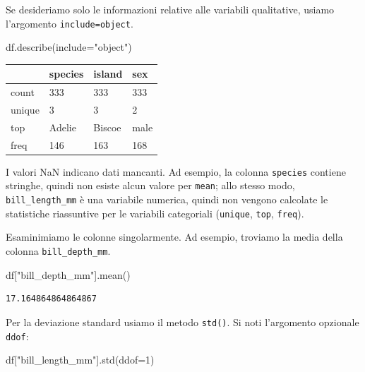 \documentclass[
  letterpaper,
  krantz2]{{[}./krantz{]}}
\newenvironment{Shaded}{\begin{snugshade}}{\end{snugshade}}
\newcommand{\DecValTok}[1]{\textcolor[rgb]{0.68,0.00,0.00}{#1}}
\newcommand{\NormalTok}[1]{\textcolor[rgb]{0.00,0.23,0.31}{#1}}
\newcommand{\OperatorTok}[1]{\textcolor[rgb]{0.37,0.37,0.37}{#1}}
\newcommand{\StringTok}[1]{\textcolor[rgb]{0.13,0.47,0.30}{#1}}
\begin{document}
Se desideriamo solo le informazioni relative alle variabili qualitative,
usiamo l'argomento
\texttt{include=\textquotesingle{}object\textquotesingle{}}.

\begin{Shaded}
\begin{Highlighting}[]
\NormalTok{df.describe(include}\OperatorTok{=}\StringTok{"object"}\NormalTok{)}
\end{Highlighting}
\end{Shaded}

\begin{longtable}[]{@{}llll@{}}
\toprule\noalign{}
& species & island & sex \\
\midrule\noalign{}
\endhead
\bottomrule\noalign{}
\endlastfoot
count & 333 & 333 & 333 \\
unique & 3 & 3 & 2 \\
top & Adelie & Biscoe & male \\
freq & 146 & 163 & 168 \\
\end{longtable}

I valori NaN indicano dati mancanti. Ad esempio, la colonna
\texttt{species} contiene stringhe, quindi non esiste alcun valore per
\texttt{mean}; allo stesso modo, \texttt{bill\_length\_mm} è una
variabile numerica, quindi non vengono calcolate le statistiche
riassuntive per le variabili categoriali (\texttt{unique}, \texttt{top},
\texttt{freq}).

Esaminimiamo le colonne singolarmente. Ad esempio, troviamo la media
della colonna \texttt{bill\_depth\_mm}.

\begin{Shaded}
\begin{Highlighting}[]
\NormalTok{df[}\StringTok{"bill\_depth\_mm"}\NormalTok{].mean()}
\end{Highlighting}
\end{Shaded}

\begin{verbatim}
17.164864864864867
\end{verbatim}

Per la deviazione standard usiamo il metodo \texttt{std()}. Si noti
l'argomento opzionale \texttt{ddof}:

\begin{Shaded}
\begin{Highlighting}[]
\NormalTok{df[}\StringTok{"bill\_length\_mm"}\NormalTok{].std(ddof}\OperatorTok{=}\DecValTok{1}\NormalTok{)}
\end{Highlighting}
\end{Shaded}
\end{document}

